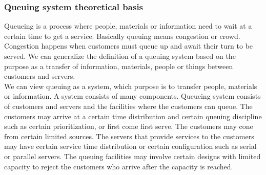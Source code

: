 \documentclass[13pt,a4paper]{article}
\begin{document}
			\subsubsection{Queuing system theoretical basis}
				Queueing is a process where people, materials or information need to wait at a certain time to get a service. Basically queuing means congestion or crowd. Congestion happens when customers must queue up and await their turn to be served. We can generalize the definition of a queuing system based on the purpose as a transfer of information, materials, people or things between customers and servers. \\
				We can view queuing as a system, which purpose is to transfer people, materials or information. A system consists of many components. Queueing system consists  of customers and servers and the facilities where the customers can queue. The customers may arrive at a certain time distribution and certain queuing discipline such as certain prioritization, or first come first serve. The customers may cone from certain limited sources. The servers that provide services to the customers may have certain service time distribution or certain configuration such as serial or parallel servers. The queuing facilities may involve certain designs with limited capacity to reject the customers who arrive after the capacity is reached.
\end{document}
